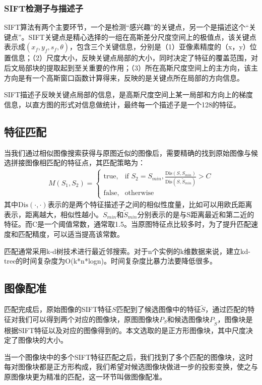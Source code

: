 \documentclass[UTF8]{csoarticle}
\begin{document}
\subsubsection{SIFT检测子与描述子}
SIFT算法有两个主要环节，一个是检测“感兴趣”的关键点，另一个是描述这个“关键点”。SIFT关键点是精心选择的一组在高斯差分尺度空间上的极值点，该关键点表示成\((x_f,y_f,s_f,\theta)\)，包含三个关键信息，分别是（1）亚像素精度的（x，y）位置信息；（2）尺度大小，反映关键点局部的大小，同时决定了特征的覆盖范围，对后文局部块的提取起到至关重要的作用；（3）所在高斯尺度空间上的主方向，该主方向是有一个高斯窗口函数计算得来，反映的是关键点所在局部的方向信息。

SIFT描述子反映关键点局部的信息，是高斯尺度空间上某一局部和方向上的梯度信息，以直方图的形式对信息做统计，最终每一个描述子是一个128的特征。

\subsection{特征匹配}
当我们通过相似图像搜索获得与原图近似的图像后，需要精确的找到原始图像与候选拼接图像相匹配的特征点，其匹配策略为：
\begin{align}
  M(S_1,S_2) = 
\begin{cases} 
\text{true}, & \mbox{if } S_2 = S_{min},\frac{\text{Dis}(S,S_{min})}{\text{Dis}(S,\tilde{S}_{min})} > C \\
\text{false}, & \mbox{otherwise}
\end{cases}
\end{align}
其中\(\text{Dis}(\cdot,\cdot)\)表示的是两个特征描述子之间的相似性度量，比如可以用欧氏距离表示，距离越大，相似性越小。\(S_{min}\)和\(\tilde{S}_{min}\)分别表示的是与S距离最近和第二近的特征。而C是一个阈值常数，通常取1.5。当原图特征点比较多时，为了提升匹配速度和匹配精度，可以适当提高该常数。

匹配通常采用k-d树技术进行最近邻搜索。对于n个实例的k维数据来说，建立kd-tree的时间复杂度为O(k*n*logn)。时间复杂度比暴力法要降低很多。

\subsection{图像配准}
匹配完成后，原始图像的SIFT特征\(S\)匹配到了候选图像中的特征\(\tilde{S}\)，通过匹配的特征对我们可以得到两个对应的图像块，原图图像块\(P_S\)和候选图像块\(P_{\tilde{S}}\)，图像块是根据SIFT特征以及对应的图像得到的。本文选取的是正方形图像块，其中尺度决定了图像块的大小。

当一个图像块中的多个SIFT特征匹配之后，我们找到了多个匹配的图像块，这时每对图像块都是正方形构成，我们希望对候选图像块做进一步的投影变换，使之与原图像块更为精准的匹配，这一环节叫做图像配准。
\end{document}
